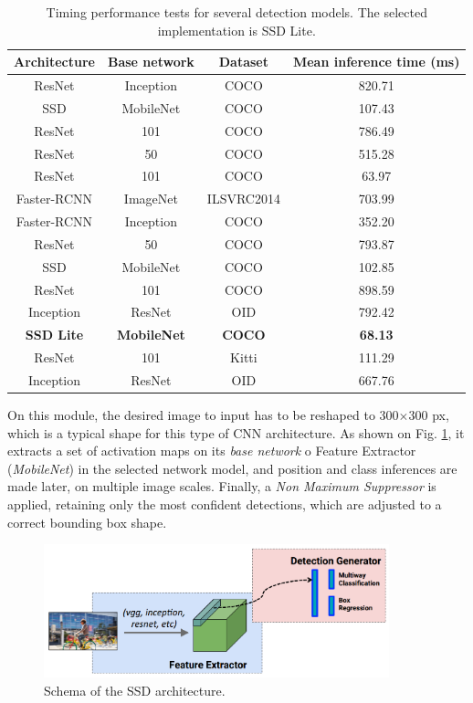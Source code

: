 \begin{table}[h]
	\centering
	\begin{tabular}{|c|c|c|c|}
		\hline
		\textbf{Architecture} & \textbf{Base network} & \textbf{Dataset} & \textbf{Mean inference time} (ms) \\ \hline
		ResNet  & Inception  & COCO & 820.71 \\ \hline
		SSD  & MobileNet  & COCO & 107.43 \\ \hline
		ResNet  & 101  & COCO & 786.49 \\ \hline
		ResNet  & 50  & COCO & 515.28 \\ \hline
		ResNet  & 101  & COCO & 63.97 \\ \hline
		Faster-RCNN  & ImageNet  & ILSVRC2014 & 703.99 \\ \hline
		Faster-RCNN  & Inception  & COCO & 352.20 \\ \hline
		ResNet  & 50  & COCO & 793.87 \\ \hline
		SSD  & MobileNet  & COCO & 102.85 \\ \hline
		ResNet  & 101  & COCO & 898.59 \\ \hline
		Inception  & ResNet  & OID & 792.42 \\ \hline
		\textbf{SSD Lite}  & \textbf{MobileNet}  & \textbf{COCO} & \textbf{68.13} \\ \hline
		ResNet  & 101  & Kitti & 111.29 \\ \hline
		Inception  & ResNet  & OID & 667.76 \\ \hline
	\end{tabular}
	\caption{Timing performance tests for several detection models. The selected implementation is SSD Lite.}
	\label{tab:model_tests}
\end{table}

On this module, the desired image to input has to be reshaped to 300$\times$300 px, which is a typical shape for this type of CNN architecture. As shown on Fig. \ref{fig:perception_ssd}, it extracts a set of activation maps on its \emph{base network} o Feature Extractor (\emph{MobileNet}) in the selected network model, and position and class inferences are made later, on multiple image scales. Finally, a \emph{Non Maximum Suppressor} is applied, retaining only the most confident detections, which are adjusted to a correct bounding box shape.

\begin{figure}[h]
	\centering
	\includegraphics[width=10cm]{images/SSD_schematic}
	\caption{Schema of the SSD architecture.}
	\label{fig:perception_ssd}
\end{figure}



